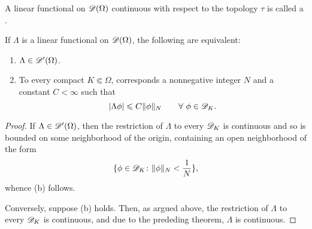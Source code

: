 \begin{definition}
    A linear functional on $\mathscr{D}(\Omega)$ continuous with respect to the topology $\tau$ is called a .
\end{definition}

\begin{theorem}
    If $\Lambda$ is a linear functional on $\mathscr{D}(\Omega)$, the following are equivalent: 
    \begin{enumerate}[label=(\alph*)]
        \item $\Lambda\in\mathscr{D}'(\Omega)$. 
        \item To every compact $K\Subset\Omega$, corresponds a nonnegative integer $N$ and a constant $C < \infty$ such that
        \begin{equation*}
            |\Lambda\phi|\leqslant C\|\phi\|_N\qquad\forall~\phi\in\mathscr{D}_K.
        \end{equation*}
    \end{enumerate}
\end{theorem}
\begin{proof}
    If $\Lambda\in\mathscr{D}'(\Omega)$, then the restriction of $\Lambda$ to every $\mathscr{D}_K$ is continuous and so is bounded on some neighborhood of the origin, containing an open neighborhood of the form 
    \begin{equation*}
        \{\phi\in\mathscr{D}_K\colon \|\phi\|_N < \frac{1}{N}\},
    \end{equation*}
    whence (b) follows.

    Conversely, suppose (b) holds. Then, as argued above, the restriction of $\Lambda$ to every $\mathscr{D}_K$ is continuous, and due to the prededing theorem, $\Lambda$ is continuous.
\end{proof}